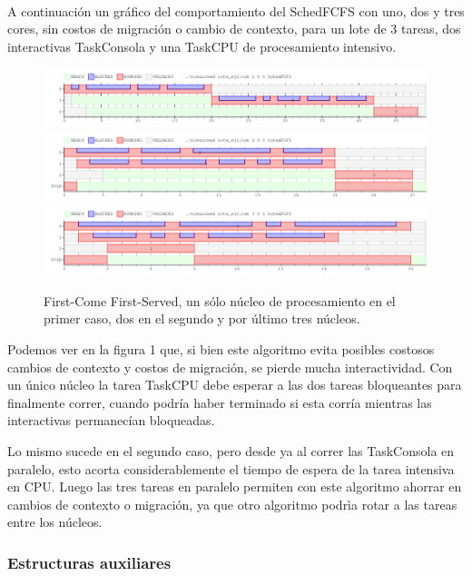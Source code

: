 ~

A continuación un gráfico del comportamiento del SchedFCFS con uno, dos y tres cores, sin costos de migración o cambio de contexto, para un lote de 3 tareas, dos interactivas TaskConsola y una TaskCPU de procesamiento intensivo.

\begin{figure}[H]
\centering\includegraphics[width=18 cm]{graficos/ej2FCFS1.png}
\centering\includegraphics[width=18 cm]{graficos/ej2FCFS2.png}
\centering\includegraphics[width=18 cm]{graficos/ej2FCFS3.png}
\caption{First-Come First-Served, un sólo núcleo de procesamiento en el primer caso, dos en el segundo y por último tres núcleos.}
\end{figure}

Podemos ver en la figura 1 que, si bien este algoritmo evita posibles costosos cambios de contexto y costos de migración, se pierde mucha interactividad. Con un único núcleo la tarea TaskCPU debe esperar a las dos tareas bloqueantes para finalmente correr, cuando podría haber terminado si esta corría mientras las interactivas permanecían bloqueadas.

Lo mismo sucede en el segundo caso, pero desde ya al correr las TaskConsola en paralelo, esto acorta considerablemente el tiempo de espera de la tarea intensiva en CPU. Luego las tres tareas en paralelo permiten con este algoritmo ahorrar en cambios de contexto o migración, ya que otro algoritmo podrìa rotar a las tareas entre los núcleos.

\subsubsection{Estructuras auxiliares}

